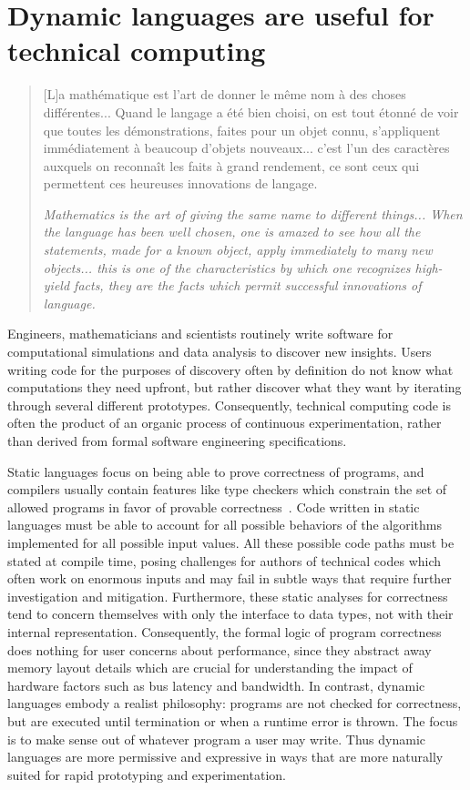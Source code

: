 \documentclass[pldi]{sigplanconf-pldi15}
\begin{document}
\tableofcontents %

\section{Dynamic languages are useful for technical computing}

\begin{quote}
	[L]a math\'ematique est l'art de donner le m\^eme nom \`a des choses
	diff\'erentes... Quand le langage a \'et\'e bien choisi, on est tout
	\'etonn\'e de voir que toutes les d\'emonstrations, faites pour un
	objet connu, s'appliqu\-ent imm\'ediatement \`a beaucoup d'objets
	nouveaux... c'est l'un des caract\`eres auxquels on reconna\^it les
	faits \`a grand rendement, ce sont ceux qui permettent ces heureuses
	innovations de langage. \cite{Poincare1908}
	
	\textit{Mathematics is the art of giving the same name to different
	things... When the language has been well chosen, one is amazed to see
	how all the statements, made for a known object, apply immediately
	to many new objects... this is one of the characteristics by which one
	recognizes high-yield facts, they are the facts which permit successful
	innovations of language.}
\end{quote}

Engineers, mathematicians and scientists routinely write software for
computational simulations and data analysis to discover new insights.
Users writing code for the purposes of discovery often by definition do not
know what computations they need upfront, but rather discover what they want by
iterating through several different prototypes. Consequently, technical
computing code is often the product of an organic process of continuous
experimentation, rather than derived from formal software engineering
specifications.

Static languages focus on being able to prove correctness of programs, and
compilers usually contain features like type checkers which constrain the set
of allowed programs in favor of provable correctness~\cite{Pierce2002}. Code written in static
languages must be able to account for all possible behaviors of the algorithms
implemented for all possible input values. All these possible code paths must
be stated at compile time, posing challenges for authors of technical codes which
often work on enormous inputs and may fail in subtle ways that require further
investigation and mitigation. Furthermore, these static analyses for
correctness tend to concern themselves with only the interface to data types,
not with their internal representation. Consequently, the formal logic of
program correctness does nothing for user concerns about performance, since
they abstract away memory layout details which are crucial for understanding the
impact of hardware factors such as bus latency and bandwidth. In contrast,
dynamic languages embody a realist philosophy: programs are not checked for
correctness, but are executed until termination or when a runtime error is
thrown. The focus is to make sense out of whatever program a user may write.
Thus dynamic languages are more permissive and expressive in ways that are more
naturally suited for rapid prototyping and experimentation.
\end{document}
